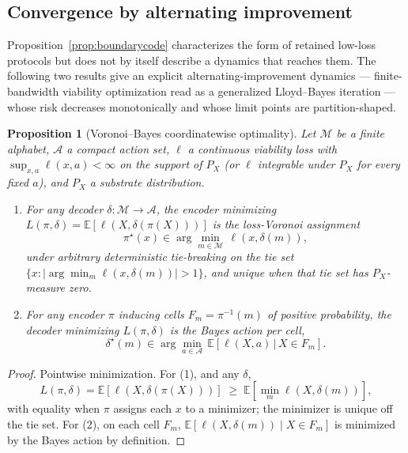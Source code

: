 \documentclass[12pt]{article}
\newtheorem{proposition}{Proposition}
\theoremstyle{definition}
\newcommand{\A}{\mathcal{A}}
\newcommand{\M}{\mathcal{M}}
\newcommand{\E}{\mathbb{E}}
\begin{document}
\subsection{Convergence by alternating improvement}
\label{sec:convergence}

Proposition~\ref{prop:boundarycode} characterizes the form of retained low-loss protocols but does not by itself describe a dynamics that reaches them. The following two results give an explicit alternating-improvement dynamics --- finite-bandwidth viability optimization read as a generalized Lloyd--Bayes iteration --- whose risk decreases monotonically and whose limit points are partition-shaped.

\begin{proposition}[Voronoi--Bayes coordinatewise optimality]
\label{prop:voronoibayes}
Let $\M$ be a finite alphabet, $\A$ a compact action set, $\ell$ a continuous viability loss with $\sup_{x,a}\ell(x,a) < \infty$ on the support of $P_X$ (or $\ell$ integrable under $P_X$ for every fixed $a$), and $P_X$ a substrate distribution.
\begin{enumerate}
\item For any decoder $\delta:\M\to\A$, the encoder minimizing $L(\pi,\delta)=\E[\ell(X,\delta(\pi(X)))]$ is the loss-Voronoi assignment
\[
\pi^\star(x) \in \arg\min_{m\in\M}\,\ell(x,\delta(m)),
\]
under arbitrary deterministic tie-breaking on the tie set $\{x:|\arg\min_m\ell(x,\delta(m))|>1\}$, and unique when that tie set has $P_X$-measure zero.
\item For any encoder $\pi$ inducing cells $F_m=\pi^{-1}(m)$ of positive probability, the decoder minimizing $L(\pi,\delta)$ is the Bayes action per cell,
\[
\delta^\star(m) \in \arg\min_{a\in\A}\,\E\!\left[\ell(X,a)\,\big|\,X\in F_m\right].
\]
\end{enumerate}
\end{proposition}

\begin{proof}
Pointwise minimization. For (1), and any $\delta$,
\[
L(\pi,\delta)=\E[\ell(X,\delta(\pi(X)))]\;\geq\;\E[\min_m \ell(X,\delta(m))],
\]
with equality when $\pi$ assigns each $x$ to a minimizer; the minimizer is unique off the tie set. For (2), on each cell $F_m$, $\E[\ell(X,\delta(m))\mid X\in F_m]$ is minimized by the Bayes action by definition.
\end{proof}
\end{document}
